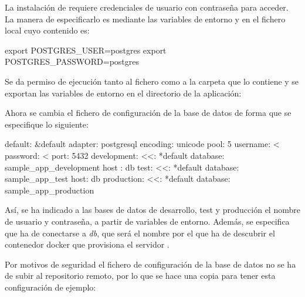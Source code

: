 La instalación de  requiere credenciales de usuario con contraseña para acceder. La manera de especificarlo es mediante las variables de entorno  y  en el fichero local  cuyo contenido es:

\begin{codelisting}
\label{code:credentials}
\begin{code}
export POSTGRES_USER=postgres
export POSTGRES_PASSWORD=postgres
\end{code}
\end{codelisting}

Se da permiso de ejecución tanto al fichero como a la carpeta que lo contiene y se exportan las variables de entorno en el directorio de la aplicación:


Ahora se cambia el fichero de configuración de la base de datos de forma que se especifique lo siguiente:

\begin{codelisting}
\label{code:database}
\begin{code}
default: &default
  adapter: postgresql
  encoding: unicode
  pool: 5
  username: <%
  password: <%
  port: 5432
development:
  <<: *default
  database: sample_app_development  
  host : db
test:
  <<: *default
  database: sample_app_test
  host: db
production:
  <<: *default
  database: sample_app_production
\end{code}
\end{codelisting}

Así, se ha indicado a las bases de datos de desarrollo, test y producción el nombre de usuario y contraseña, a partir de variables de entorno. Además, se especifica que ha de conectarse a \textit{db}, que será el nombre por el que ha de descubrir el contenedor docker que provisiona el servidor .

Por motivos de seguridad el fichero de configuración de la base de datos no se ha de subir al repositorio remoto, por lo que se hace una copia para tener esta configuración de ejemplo:

